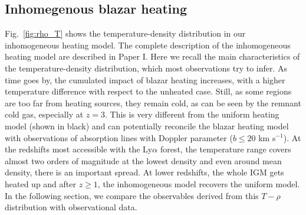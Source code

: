 \documentclass[numberedappendix]{emulateapj}
\begin{document}
\subsection{Inhomegenous blazar heating}
Fig.~\ref{fig:rho_T} shows the temperature-density distribution in our inhomogeneous heating model. The complete description of the inhomogeneous heating model are described in Paper I. Here we recall the main characteristics of the temperature-density distribution, which most observations try to infer. As time goes by, the cumulated impact of blazar heating increases, with a higher temperature difference with respect to the unheated case. Still, as some regions are too far from heating sources, they remain cold, as can be seen by the remnant cold gas, especially at $z=3$. This is very different from the uniform heating model (shown in black) and can potentially reconcile the blazar heating model with observations of absorption lines with Doppler parameter ($b\leq 20$ km s$^{-1}$). At the redshifts most accessible with the Ly$\alpha$ forest, the temperature range  covers almost two orders of magnitude at the lowest density and  even around mean density, there is an important spread. At lower redshifts, the whole IGM gets heated up and after $z\geqslant1$, the inhomogeneous model recovers the uniform model.  In the following section, we compare the observables derived from this $T-\rho$ distribution with observational data.
\end{document}
